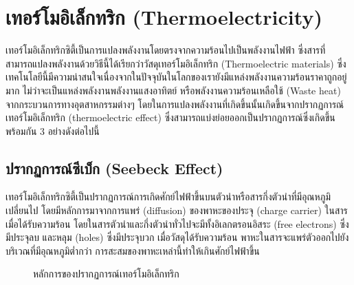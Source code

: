 \message{ !name(solar.tex)}\documentclass[
a4paper,
svgnames,
openany,
justified,
]{tufte-book}
\begin{document}
\chapter{เทอร์โมอิเล็กทริก (Thermoelectricity)}

เทอร์โมอิเล็กทริกซิตี้เป็นการแปลงพลังงานโดยตรงจากความร้อนไปเป็นพลังงานไฟฟ้า ซึ่งสารที่สามารถแปลงพลังงานด้วยวิธีนี้ได้เรียกว่าวัสดุเทอร์โมอิเล็กทริก (Thermoelectric materials) ซึ่งเทคโนโลยีนี้มีความน่าสนใจเนื่องจากในปัจจุบันในโลกของเรายังมีแหล่งพลังงานความร้อนราคาถูกอยู่มาก ไม่ว่าจะเป็นแหล่งพลังงานพลังงานแสงอาทิตย์ หรือพลังงานความร้อนเหลือใช้ (Waste heat) จากกระบวนการทางอุตสาหกรรมต่างๆ โดยในการแปลงพลังงานที่เกิดขึ้นนั้นเกิดขึ้นจากปรากฏการณ์เทอร์โมอิเล็กทริก (thermoelectric effect) ซึ่งสามารถแบ่งย่อยออกเป็นปรากฏการณ์ซึ่งเกิดขึ้นพร้อมกัน 3 อย่างดังต่อไปนี้

\section{ปรากฏการณ์ซีเบ็ก (Seebeck Effect)}

เทอร์โมอิเล็กทริกซิตี้เป็นปรากฏการณ์การเกิดศักย์ไฟฟ้าขึ้นบนตัวนำหรือสารกึ่งตัวนำที่มีอุณหภูมิเปลี่ยนไป โดยมีหลักการมาจากการแพร่ (diffusion) ของพาหะของประจุ (charge carrier) ในสารเมื่อได้รับความร้อน โดยในสารตัวนำและกึ่งตัวนำทั่วไปจะมีทั้งอิเลกตรอนอิสระ (free electrons) ซึ่งมีประจุลบ และหลุม (holes) ซึ่งมีประจุบวก เมื่อวัสดุได้รับความร้อน พาหะในสารจะแพร่ตัวออกไปยังบริเวณที่มีอุณหภูมิต่ำกว่า การสะสมของพาหะเหล่านี้ทำให้เกินศักย์ไฟฟ้าขึ้น

\begin{figure}
  \centering
  \caption{หลักการของปรากฏการณ์เทอร์โมอิเล็กทริก}
\end{figure}
\end{document}
